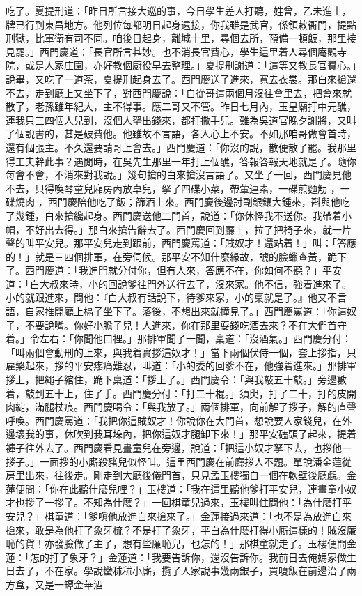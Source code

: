 \begin{showcontents}{}
吃了。夏提刑道：「昨日所言接大巡的事，今日學生差人打聽，姓曾，乙未進士，牌已行到東昌地方。他列位每都明日起身遠接，你我雖是武官，係領敕衙門，提點刑獄，比軍衛有司不同。咱後日起身，離城十里，尋個去所，預備一頓飯，那里接見罷。」西門慶道：「長官所言甚妙。也不消長官費心，學生這里着人尋個庵觀寺院，或是人家庄園，亦好教個廚役早去整理。」夏提刑謝道：「這等又教長官費心。」說畢，又吃了一道茶，夏提刑起身去了。西門慶送了進來，寬去衣裳。那白來搶還不去，走到廳上又坐下了，對西門慶說：「自從哥這兩個月沒往會里去，把會來就散了，老孫雖年紀大，主不得事。應二哥又不管。昨日七月內，玉皇廟打中元醮，連我只三四個人兒到，沒個人拏出錢來，都打撒手兒。難為吳道官晚夕謝將，又叫了個說書的，甚是破費他。他雖故不言語，各人心上不安。不如那咱哥做會首時，還有個張主。不久還要請哥上會去。」西門慶道：「你沒的說，散便散了罷。我那里得工夫幹此事？遇閒時，在吳先生那里一年打上個醮，答報答報天地就是了。隨你每會不會，不消來對我說。」幾句搶的白來搶沒言語了。又坐了一回，西門慶見他不去，只得喚琴童兒廂房內放卓兒，拏了四碟小菜，帶葷連素，一碟煎麵觔 ，一碟燒肉 ，西門慶陪他吃了飯；篩酒上來。西門慶後邊討副銀鑲大鍾來，斟與他吃了幾鍾，白來搶纔起身。西門慶送他二門首，說道：「你休怪我不送你。我帶着小帽，不好出去得。」那白來搶告辭去了。西門慶回到廳上，拉了把椅子來，就一片聲的叫平安兒。那平安兒走到跟前，西門慶罵道：「賊奴才！還站着！」叫：「答應的！」就是三四個排軍，在旁伺候。那平安不知什麼緣故，諕的臉蠟查黃，跪下了。西門慶道：「我進門就分付你，但有人來，答應不在，你如何不聽？」平安道：「白大叔來時，小的回說爹往門外送行去了，沒來家。他不信，強着進來了。小的就跟進來，問他：『白大叔有話說下，待爹來家，小的稟就是了。』他又不言語，自家推開廳上槅子坐下了。落後，不想出來就撞見了。」西門慶罵道：「你這奴子，不要說嘴。你好小膽子兒！人進來，你在那里耍錢吃酒去來？不在大們首守着。」令左右：「你聞他口裡。」那排軍聞了一聞，稟道：「沒酒氣。」西門慶分付：「叫兩個會動刑的上來，與我着實拶這奴才！」當下兩個伏侍一個，套上拶指，只雇檠起來，拶的平安疼痛難忍，叫道：「小的委的回爹不在，他強着進來。」那排軍拶上，把繩子綰住，跪下稟道：「拶上了。」西門慶令：「與我敲五十敲。」旁邊數着，敲到五十上，住了手。西門慶分付：「打二十棍。」須臾，打了二十，打的皮開肉綻，滿腿杖痕。西門慶喝令：「與我放了。」兩個排軍，向前解了拶子，解的直聲呼喚。西門慶罵道：「我把你這賊奴才！你說你在大門首，想說要人家錢兒，在外邊壞我的事，休吹到我耳垛內，把你這奴才腿卸下來！」那平安磕頭了起來，提着褲子往外去了。西門慶看見畫童兒在旁邊，說道：「把這小奴才拏下去，也拶他一拶子。」一面拶的小廝殺豬兒似怪叫。這里西門慶在前廳拶人不題。單說潘金蓮從房里出來，往後走。剛走到大廳後儀門首，只見孟玉樓獨自一個在軟壁後廳覷。金蓮便問：「你在此聽什麼兒哩？」玉樓道：「我在這里聽他爹打平安兒，連畫童小奴才也拶了一拶子。不知為什麼？」一回棋童兒過來，玉樓叫住問他：「為什麼打平安兒？」棋童道：「爹嗔他放進白來搶來了。」金蓮接過來道：「也不是為放進白來搶來，敢是為他打了象牙梳？不是打了象牙，平白為什麼打得小廝這樣的！賊沒廉恥的貨！亦發臉做了主了，想有些廉恥兒，也怎的！」那棋童就走了。玉樓便問金蓮：「怎的打了象牙？」金蓮道：「我要告訴你，還沒告訴你。我前日去俺媽家做生日去了，不在家。學說蠻秫秫小廝，攬了人家說事幾兩銀子，買嗄飯在前邊治了兩方盒，又是一罈金華酒 
\end{showcontents}
